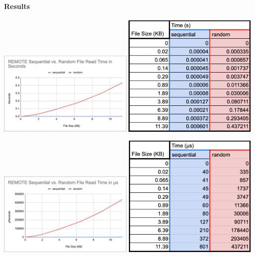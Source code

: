 \paragraph{Results}

\includegraphics[width=6.5cm]{4.3 Results/my graph seconds.png}
\hspace{.5cm}
\includegraphics[width=6.5cm]{4.3 Results/table remote seconds.png}

\hspace{.25cm}

\includegraphics[width=6.5cm]{4.3 Results/my graph microseconds.png}
\hspace{.5cm}
\includegraphics[width=6.5cm]{4.3 Results/table remote microseconds.png}

